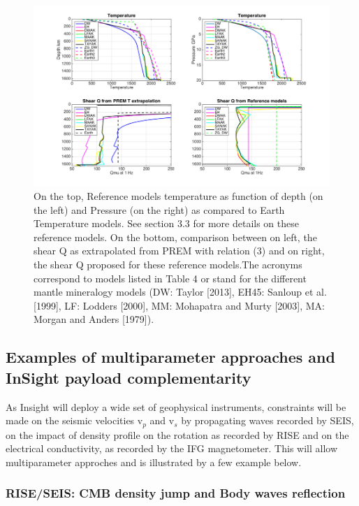 \begin{figure}[h!]
\begin{center}
\includegraphics[width=1.1\textwidth]
{figures/FigshearQ.png}
\caption{On the top, Reference models temperature as function of depth (on the left) and Pressure (on the right) as compared to Earth Temperature models. See section 3.3 for more details on these reference models. On the bottom, comparison between on left, the shear Q as extrapolated from PREM with relation (3) and on right, the shear Q proposed for these reference models.The acronyms correspond to models listed in Table 4 or stand for the different mantle mineralogy models (DW: Taylor [2013], EH45: Sanloup et al. [1999], LF: Lodders [2000], MM: Mohapatra and Murty [2003], MA: Morgan and Anders [1979]).}
\label{fig:FigshearQ.png} 
\end{center}
\end{figure}

\subsection{Examples of multiparameter approaches and InSight payload complementarity}

As Insight will deploy a wide set of geophysical instruments, constraints will be made on the seismic velocities v$_p$ and v$_s$ by propagating waves recorded by SEIS, on the impact of density profile on the rotation as recorded by RISE and on the electrical conductivity, as recorded by the IFG magnetometer. This will allow multiparameter approches and is illustrated by a few example below.

\subsubsection{RISE/SEIS:  CMB density jump and Body waves reflection}


